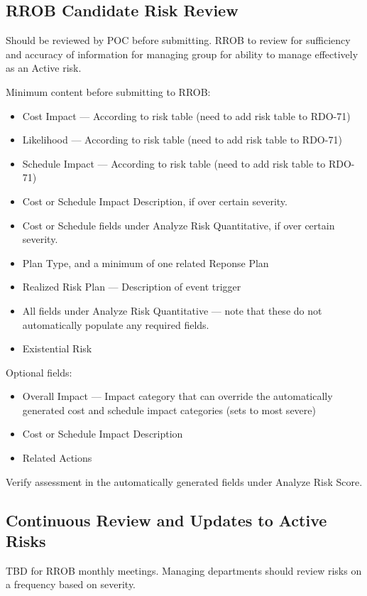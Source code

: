 \subsection{RROB Candidate Risk Review}

Should be reviewed by POC before submitting.
RROB to review for sufficiency and accuracy of information for managing group for ability to manage effectively as an Active risk.

Minimum content before submitting to RROB:
\begin{itemize}
	\item Cost Impact --- According to risk table (need to add risk table to RDO-71)
	\item Likelihood --- According to risk table (need to add risk table to RDO-71)
	\item Schedule Impact --- According to risk table (need to add risk table to RDO-71)
	\item Cost or Schedule Impact Description, if over certain severity.
	\item Cost or Schedule fields under Analyze Risk Quantitative, if over certain severity.
	\item Plan Type, and a minimum of one related Reponse Plan
	\item Realized Risk Plan --- Description of event trigger
	\item All fields under Analyze Risk Quantitative --- note that these do not automatically populate any required fields.
	\item Existential Risk
\end{itemize}

Optional fields:
\begin{itemize}
	\item Overall Impact --- Impact category that can override the automatically generated cost and schedule impact categories (sets to most severe)
	\item Cost or Schedule Impact Description
	\item Related Actions
\end{itemize}

Verify assessment in the automatically generated fields under Analyze Risk Score.

\subsection{Continuous Review and Updates to Active Risks}

TBD for RROB monthly meetings.
Managing departments should review risks on a frequency based on severity.

